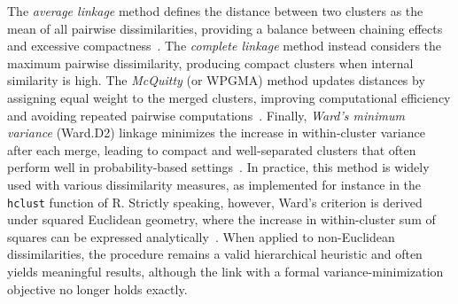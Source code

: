 \documentclass[preprint,12pt]{elsarticle}
\begin{document}
\begin{table}
\small
\centering
\renewcommand{\arraystretch}{1.2}
\caption{Hierarchical clustering linkages used in Section~\ref{sec:simulation}. 
Here \(\mathcal{C}_1, \mathcal{C}_2, \mathcal{C}_3\) denote clusters of probability vectors \(p \in \Delta_{s-1}\);
\(d(p,q)\) is a dissimilarity between individual distributions; 
\(\bar p_i = |\mathcal{C}_i|^{-1}\sum_{p\in \mathcal{C}_i} p\) is the centroid of cluster \(\mathcal{C}_i\);
and \(\|\cdot\|\) is the Euclidean norm.}
\label{tab:clustering_methods}
\end{table}

The \textit{average linkage} method defines the distance between two clusters as the mean of all pairwise dissimilarities, providing a balance between chaining effects and excessive compactness~\citep{rr1958statiscal}. 
The \textit{complete linkage} method instead considers the maximum pairwise dissimilarity, producing compact clusters when internal similarity is high. 
The \textit{McQuitty} (or WPGMA) method updates distances by assigning equal weight to the merged clusters, improving computational efficiency and avoiding repeated pairwise computations~\citep{mcquitty1966similarity}. 
Finally, \textit{Ward’s minimum variance} (Ward.D2) linkage minimizes the increase in within-cluster variance after each merge, leading to compact and well-separated clusters that often perform well in probability-based settings~\citep{ward1963hierarchical}. 
In practice, this method is widely used with various dissimilarity measures, as implemented for instance in the \texttt{hclust} function of R. 
Strictly speaking, however, Ward’s criterion is derived under squared Euclidean geometry, where the increase in within-cluster sum of squares can be expressed analytically~\citep{murtagh2014ward}. 
When applied to non-Euclidean dissimilarities, the procedure remains a valid hierarchical heuristic and often yields meaningful results, although the link with a formal variance-minimization objective no longer holds exactly.
\end{document}

